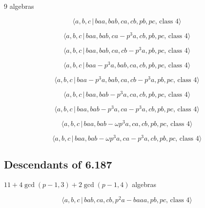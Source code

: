 \documentclass[10pt]{article}
\begin{document}
9 algebras

\begin{equation}
\langle a,b,c\,|\,baa,bab,ca,cb,pb,pc,\,\text{class }4\rangle  \tag{7.1807}
\end{equation}

\begin{equation}
\langle a,b,c\,|\,baa,bab,ca-p^3a,cb,pb,pc,\,\text{class }4\rangle 
\tag{7.1808}
\end{equation}

\begin{equation}
\langle a,b,c\,|\,baa,bab,ca,cb-p^3a,pb,pc,\,\text{class }4\rangle 
\tag{7.1809}
\end{equation}

\begin{equation}
\langle a,b,c\,|\,baa-p^3a,bab,ca,cb,pb,pc,\,\text{class }4\rangle 
\tag{7.1810}
\end{equation}

\begin{equation}
\langle a,b,c\,|\,baa-p^3a,bab,ca,cb-p^3a,pb,pc,\,\text{class }4\rangle 
\tag{7.1811}
\end{equation}

\begin{equation}
\langle a,b,c\,|\,baa,bab-p^3a,ca,cb,pb,pc,\,\text{class }4\rangle 
\tag{7.1812}
\end{equation}

\begin{equation}
\langle a,b,c\,|\,baa,bab-p^3a,ca-p^3a,cb,pb,pc,\,\text{class }4\rangle 
\tag{7.1813}
\end{equation}

\begin{equation}
\langle a,b,c\,|\,baa,bab-\omega p^{3}a,ca,cb,pb,pc,\,\text{class }4\rangle 
\tag{7.1814}
\end{equation}

\begin{equation}
\langle a,b,c\,|\,baa,bab-\omega p^{3}a,ca-p^{3}a,cb,pb,pc,\,\text{class }%
4\rangle  \tag{7.1815}
\end{equation}

\subsection{Descendants of 6.187}

$11+4\gcd (p-1,3)+2\gcd (p-1,4)$ algebras

\begin{equation}
\langle a,b,c\,|\,bab,ca,cb,p^2a-baaa,pb,pc,\,\text{class }4\rangle 
\tag{7.1816}
\end{equation}
\end{document}
